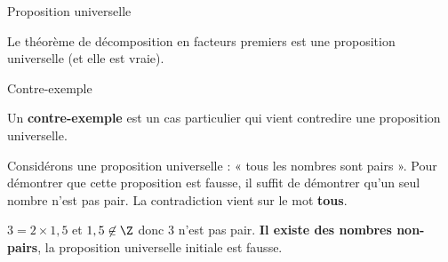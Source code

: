 \begin{pageCours}
\begin{minipage}{0.5\linewidth}
\begin{DefT}{Proposition universelle}
\end{DefT}
\end{minipage}
\begin{minipage}{0.5\linewidth}
\begin{Ex} 
  Le théorème de décomposition en facteurs premiers est une proposition
  universelle (et elle est vraie).
  

\end{Ex}
\end{minipage}

\begin{minipage}{0.5\linewidth}
\begin{DefT}{Contre-exemple}

Un \textbf{contre-exemple} est un cas particulier qui vient contredire une proposition universelle. 

\end{DefT}

\end{minipage}
\begin{minipage}{0.5\linewidth}

\begin{Ex} 

Considérons une proposition universelle : « tous les nombres sont pairs ». Pour démontrer que cette proposition est fausse, il suffit de démontrer qu'un seul nombre n'est pas pair. La contradiction vient sur le mot \textbf{tous}.

$3=2\times1,5$ et $1,5 \not\in\Z$ donc $3$ n'est pas pair. \textbf{Il existe
  des nombres non-pairs}, la proposition universelle initiale est fausse. 

\end{Ex}
\end{minipage}




\end{pageCours} 
